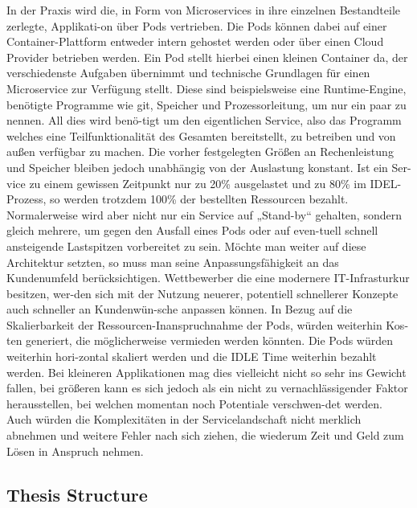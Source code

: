 \documentclass[a4paper,twoside,11pt, pagesize]{scrartcl}
\begin{document}
In der Praxis wird die, in Form von Microservices in ihre einzelnen Bestandteile zerlegte, Applikati-on über Pods vertrieben. Die Pods können dabei auf einer Container-Plattform entweder intern gehostet werden oder über einen Cloud Provider betrieben werden. Ein Pod stellt hierbei einen kleinen Container da, der verschiedenste Aufgaben übernimmt und technische Grundlagen für einen Microservice zur Verfügung stellt. Diese sind beispielsweise eine Runtime-Engine, benötigte Programme wie git, Speicher und Prozessorleitung, um nur ein paar zu nennen. All dies wird benö-tigt um den eigentlichen Service, also das Programm welches eine Teilfunktionalität des Gesamten bereitstellt, zu betreiben und von außen verfügbar zu machen. Die vorher festgelegten Größen an Rechenleistung und Speicher bleiben jedoch unabhängig von der Auslastung konstant. Ist ein Ser-vice zu einem gewissen Zeitpunkt nur zu 20\% ausgelastet und zu 80\% im IDEL-Prozess, so werden trotzdem 100\% der bestellten Ressourcen bezahlt. Normalerweise wird aber nicht nur ein Service auf „Stand-by“ gehalten, sondern gleich mehrere, um gegen den Ausfall eines Pods oder auf even-tuell schnell ansteigende Lastspitzen vorbereitet zu sein. 
Möchte man weiter auf diese Architektur setzten, so muss man seine Anpassungsfähigkeit an das Kundenumfeld berücksichtigen. Wettbewerber die eine modernere IT-Infrasturkur besitzen, wer-den sich mit der Nutzung neuerer, potentiell schnellerer Konzepte auch schneller an Kundenwün-sche anpassen können. 
In Bezug auf die Skalierbarkeit der Ressourcen-Inanspruchnahme der Pods, würden weiterhin Kos-ten generiert, die möglicherweise vermieden werden könnten. Die Pods würden weiterhin hori-zontal skaliert werden und die IDLE Time weiterhin bezahlt werden. Bei kleineren Applikationen mag dies vielleicht nicht so sehr ins Gewicht fallen, bei größeren kann es sich jedoch als ein nicht zu vernachlässigender Faktor herausstellen, bei welchen momentan noch Potentiale verschwen-det werden. Auch würden die Komplexitäten in der Servicelandschaft nicht merklich abnehmen und weitere Fehler nach sich ziehen, die wiederum Zeit und Geld zum Lösen in Anspruch nehmen.  
\subsection{Thesis Structure}
\end{document}
